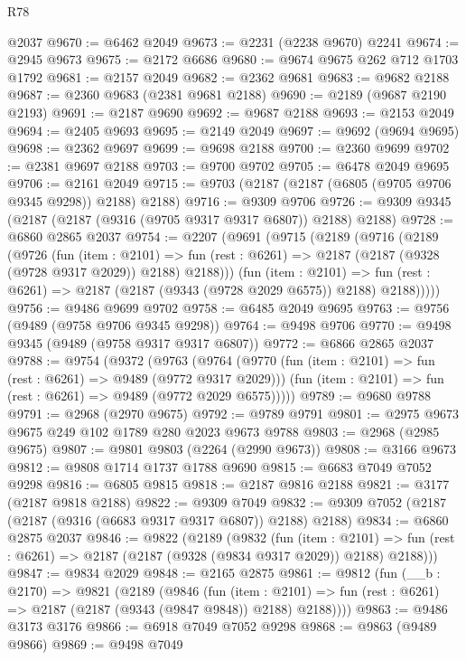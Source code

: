 \begin{lexlean}{R78}
\begin{coremodule}
    @2037
@9670 := @6462 @2049
@9673 := @2231 (@2238 @9670) @2241
@9674 := @2945 @9673
@9675 := @2172 @6686
@9680 := @9674 @9675 @262 @712 @1703 @1792
@9681 := @2157 @2049
@9682 := @2362 @9681
@9683 := @9682 @2188
@9687 := @2360 @9683 (@2381 @9681 @2188)
@9690 := @2189 (@9687 @2190 @2193)
@9691 := @2187 @9690
@9692 := @9687 @2188
@9693 := @2153 @2049
@9694 := @2405 @9693
@9695 := @2149 @2049
@9697 := @9692 (@9694 @9695)
@9698 := @2362 @9697
@9699 := @9698 @2188
@9700 := @2360 @9699
@9702 := @2381 @9697 @2188
@9703 := @9700 @9702
@9705 := @6478 @2049 @9695
@9706 := @2161 @2049
@9715 := @9703 (@2187 (@2187 (@6805 (@9705 @9706 @9345 @9298)) @2188) @2188)
@9716 := @9309 @9706
@9726 := @9309 @9345 (@2187 (@2187 (@9316 (@9705 @9317 @9317 @6807)) @2188) @2188)
@9728 := @6860 @2865 @2037
@9754 := @2207
    (@9691
      (@9715
        (@2189
          (@9716
            (@2189
              (@9726
                (fun (item : @2101) =>
                fun (rest : @6261) => @2187 (@2187 (@9328 (@9728 @9317 @2029)) @2188) @2188)))
            (fun (item : @2101) =>
            fun (rest : @6261) => @2187 (@2187 (@9343 (@9728 @2029 @6575)) @2188) @2188)))))
@9756 := @9486 @9699 @9702
@9758 := @6485 @2049 @9695
@9763 := @9756 (@9489 (@9758 @9706 @9345 @9298))
@9764 := @9498 @9706
@9770 := @9498 @9345 (@9489 (@9758 @9317 @9317 @6807))
@9772 := @6866 @2865 @2037
@9788 := @9754
    (@9372
      (@9763
        (@9764
          (@9770 (fun (item : @2101) => fun (rest : @6261) => @9489 (@9772 @9317 @2029)))
          (fun (item : @2101) => fun (rest : @6261) => @9489 (@9772 @2029 @6575)))))
@9789 := @9680 @9788
@9791 := @2968 (@2970 @9675)
@9792 := @9789 @9791
@9801 := @2975 @9673 @9675 @249 @102 @1789 @280 @2023 @9673 @9788
@9803 := @2968 (@2985 @9675)
@9807 := @9801 @9803 (@2264 (@2990 @9673))
@9808 := @3166 @9673
@9812 := @9808 @1714 @1737 @1788 @9690
@9815 := @6683 @7049 @7052 @9298
@9816 := @6805 @9815
@9818 := @2187 @9816 @2188
@9821 := @3177 (@2187 @9818 @2188)
@9822 := @9309 @7049
@9832 := @9309 @7052 (@2187 (@2187 (@9316 (@6683 @9317 @9317 @6807)) @2188) @2188)
@9834 := @6860 @2875 @2037
@9846 := @9822
    (@2189
      (@9832
        (fun (item : @2101) =>
        fun (rest : @6261) => @2187 (@2187 (@9328 (@9834 @9317 @2029)) @2188) @2188)))
@9847 := @9834 @2029
@9848 := @2165 @2875
@9861 := @9812
    (fun (__b : @2170) =>
    @9821
      (@2189
        (@9846
          (fun (item : @2101) =>
          fun (rest : @6261) => @2187 (@2187 (@9343 (@9847 @9848)) @2188) @2188))))
@9863 := @9486 @3173 @3176
@9866 := @6918 @7049 @7052 @9298
@9868 := @9863 (@9489 @9866)
@9869 := @9498 @7049

\end{coremodule}
\end{lexlean}

